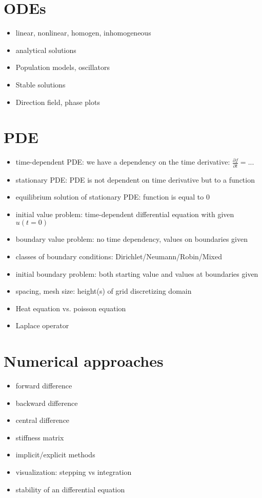 \section{ODEs}
\begin{itemize}
	\item linear, nonlinear, homogen, inhomogeneous
	\item analytical solutions
	\item Population models, oscillators
	\item Stable solutions
	\item Direction field, phase plots
\end{itemize}


\section{PDE}

\begin{itemize}
	\item time-dependent PDE: we have a dependency on the time derivative: $\frac{\partial f}{\partial t} = ...$
	\item stationary PDE: PDE is not dependent on time derivative but to a function 
	\item equilibrium solution of stationary PDE: function is equal to 0
	\item initial value problem: time-dependent differential equation with given $u(t=0)$
	\item boundary value problem: no time dependency, values on boundaries given
	\item classes of boundary conditions: Dirichlet/Neumann/Robin/Mixed
	\item initial boundary problem: both starting value and values at boundaries given
	\item spacing, mesh size: height(s) of grid discretizing domain
	\item Heat equation vs. poisson equation
	\item Laplace operator
\end{itemize}

\section{Numerical approaches}
\begin{itemize}
	\item forward difference
	\item backward difference
	\item central difference 
	\item stiffness matrix
	\item implicit/explicit methods
	\item visualization: stepping vs integration
	\item stability of an differential equation
\end{itemize}

